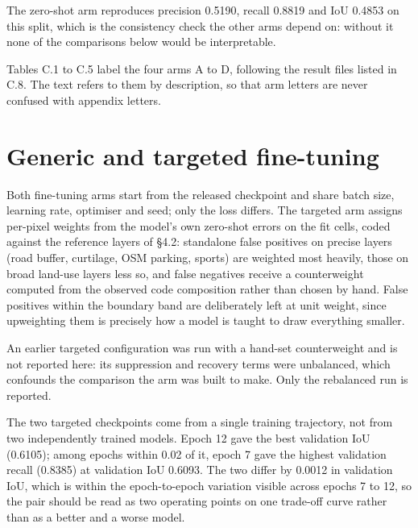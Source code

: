 The zero-shot arm reproduces precision 0.5190, recall 0.8819 and IoU 0.4853 on this split, which is the consistency check the other arms depend on: without it none of the comparisons below would be interpretable.

Tables C.1 to C.5 label the four arms A to D, following the result files listed in C.8. The text refers to them by description, so that arm letters are never confused with appendix letters.

\hypertarget{generic-and-targeted-fine-tuning}{%
\section{Generic and targeted fine-tuning}\label{generic-and-targeted-fine-tuning}}

Both fine-tuning arms start from the released checkpoint and share batch size, learning rate, optimiser and seed; only the loss differs. The targeted arm assigns per-pixel weights from the model's own zero-shot errors on the fit cells, coded against the reference layers of §4.2: standalone false positives on precise layers (road buffer, curtilage, OSM parking, sports) are weighted most heavily, those on broad land-use layers less so, and false negatives receive a counterweight computed from the observed code composition rather than chosen by hand. False positives within the boundary band are deliberately left at unit weight, since upweighting them is precisely how a model is taught to draw everything smaller.

An earlier targeted configuration was run with a hand-set counterweight and is not reported here: its suppression and recovery terms were unbalanced, which confounds the comparison the arm was built to make. Only the rebalanced run is reported.

The two targeted checkpoints come from a single training trajectory, not from two independently trained models. Epoch 12 gave the best validation IoU (0.6105); among epochs within 0.02 of it, epoch 7 gave the highest validation recall (0.8385) at validation IoU 0.6093. The two differ by 0.0012 in validation IoU, which is within the epoch-to-epoch variation visible across epochs 7 to 12, so the pair should be read as two operating points on one trade-off curve rather than as a better and a worse model.

